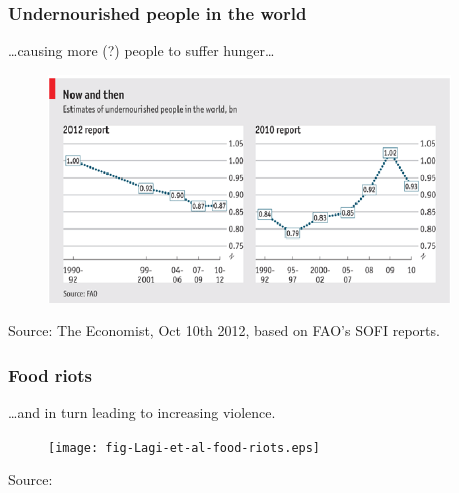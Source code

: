 \documentclass[svgnames]{beamer}
\begin{document}
\begin{frame}[label=hunger-estimates]
	\frametitle{Undernourished people in the world}
	\dots causing more (?) people to suffer hunger\dots
	\begin{figure}
		\centering
		\includegraphics[width=0.95\textwidth]{fig-hunger-estimates.eps}
	\end{figure}
	\vspace{-1em}
	\tiny{Source: The Economist, Oct 10th 2012, based on FAO's SOFI reports.}
\end{frame}


\begin{frame}[label=frame-riots]
\frametitle{Food riots}
\dots and in turn leading to increasing violence.
\vspace{-0.8em}
\begin{figure}
  \centering
  \texttt{[image: fig-Lagi-et-al-food-riots.eps]}
\end{figure}
\vspace{-1em}
 \tiny{Source: \cite{LagiBertrandBar-Yam:2011}} %
\end{frame}
\end{document}
